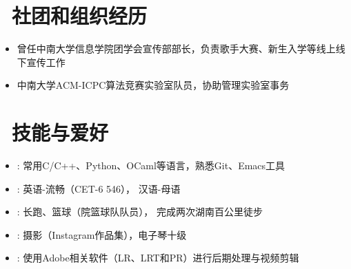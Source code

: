 \documentclass{resume}
\begin{document}
\section{\faUsers\ 社团和组织经历}
\begin{itemize}
    \item 曾任中南大学信息学院团学会宣传部部长，负责歌手大赛、新生入学等线上线下宣传工作
    \item 中南大学ACM-ICPC算法竞赛实验室队员，协助管理实验室事务
    
\end{itemize}
\section{\faTasks\ 技能与爱好}

\begin{itemize}[parsep=0.5ex]
  \item {}: 常用C/C++、Python、OCaml等语言，熟悉Git、Emacs工具
  \item {}: 英语-流畅（CET-6 546）， 汉语-母语
  \item {}: 长跑、篮球（院篮球队队员）， 完成两次湖南百公里徒步
  \item {}: 摄影（Instagram作品集），电子琴十级
  \item {}: 使用Adobe相关软件（LR、LRT和PR）进行后期处理与视频剪辑
\end{itemize}



\end{document}
